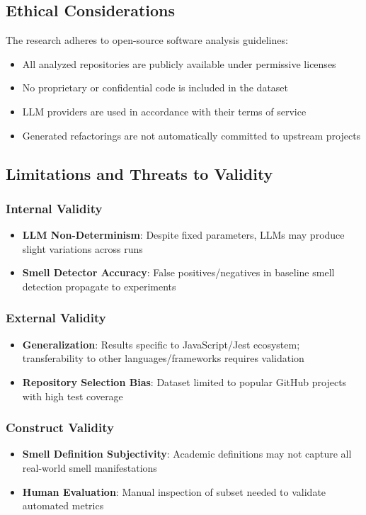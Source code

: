 \documentclass[12pt]{article}
\begin{document}
\subsection{Ethical Considerations}

The research adheres to open-source software analysis guidelines:
\begin{itemize}
    \item All analyzed repositories are publicly available under permissive licenses
    \item No proprietary or confidential code is included in the dataset
    \item LLM providers are used in accordance with their terms of service
    \item Generated refactorings are not automatically committed to upstream projects
\end{itemize}

\subsection{Limitations and Threats to Validity}

\subsubsection{Internal Validity}
\begin{itemize}
    \item \textbf{LLM Non-Determinism}: Despite fixed parameters, LLMs may produce slight variations across runs
    \item \textbf{Smell Detector Accuracy}: False positives/negatives in baseline smell detection propagate to experiments
\end{itemize}

\subsubsection{External Validity}
\begin{itemize}
    \item \textbf{Generalization}: Results specific to JavaScript/Jest ecosystem; transferability to other languages/frameworks requires validation
    \item \textbf{Repository Selection Bias}: Dataset limited to popular GitHub projects with high test coverage
\end{itemize}

\subsubsection{Construct Validity}
\begin{itemize}
    \item \textbf{Smell Definition Subjectivity}: Academic definitions may not capture all real-world smell manifestations
    \item \textbf{Human Evaluation}: Manual inspection of subset needed to validate automated metrics
\end{itemize}
\end{document}

